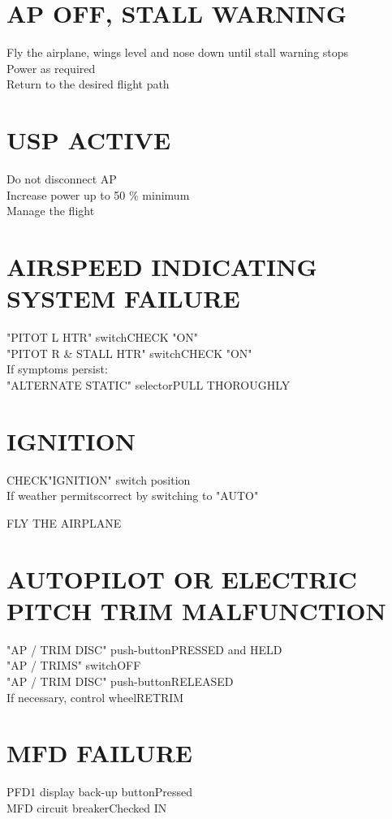 \documentclass{article}
\newcommand{\fly}{\vspace{-1em}\begin{center}\color{Green}FLY THE AIRPLANE\end{center}\vspace{-1em}}
\begin{document}
\begin{multicols*}{2}
\section*{AP OFF, STALL WARNING}
Fly the airplane, wings level and nose down until stall warning stops\\
Power as required\\
Return to the desired flight path
\section*{\color{Red}USP ACTIVE}
Do not disconnect AP\\
Increase power up to 50 \% minimum\\
Manage the flight
\section*{AIRSPEED INDICATING SYSTEM FAILURE}
"PITOT L HTR" switch\dotfill CHECK "ON"\\
"PITOT R \& STALL HTR" switch\dotfill CHECK "ON"\\
If symptoms persist:\\
"ALTERNATE STATIC" selector\dotfill PULL THOROUGHLY
\section*{\color{Orange}IGNITION}
CHECK\dotfill "IGNITION" switch position\\
If weather permits\dotfill correct by switching to "AUTO"
\fly
\section*{AUTOPILOT OR ELECTRIC PITCH TRIM MALFUNCTION}
"AP / TRIM DISC" push-button\dotfill PRESSED and HELD\\
"AP / TRIMS" switch\dotfill OFF\\
"AP / TRIM DISC" push-button\dotfill RELEASED\\
If necessary, control wheel\dotfill RETRIM
\section*{MFD FAILURE}
PFD1 display back-up button\dotfill Pressed\\
MFD circuit breaker\dotfill Checked IN\\
\end{multicols*}
\end{document}

